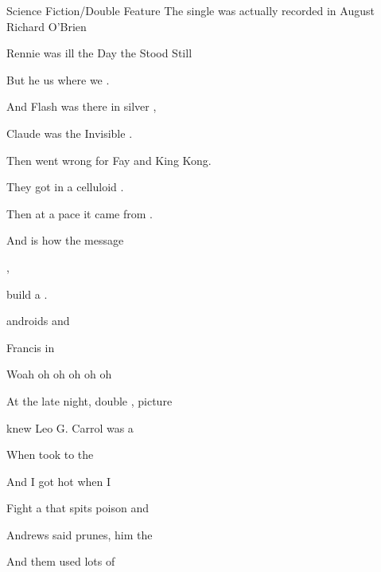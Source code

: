\begin{SBSong}{Science Fiction/Double Feature}
  {The single was actually recorded in August}
  {Richard O'Brien}
  \begin{SBVerse}
     Rennie was ill the Day the  Stood Still

    But he  us where we .

    And Flash  was there in silver ,

    Claude  was the Invisible .

    Then  went wrong for Fay  and King Kong.

    They got  in a celluloid .

    Then at a  pace it came from  .

    And  is how the message 
  \end{SBVerse}
  \begin{SBChorus}
     ,  

       build a .

     androids   and 

     Francis  in  

    Woah oh oh oh  oh oh

    At the late night, double , picture 
  \end{SBChorus}
  \begin{SBVerse}
     knew Leo G. Carrol was  a 

    When  took to the 

    And I  got hot when I   

    Fight a  that spits poison and 

     Andrews said prunes,  him the 

    And  them used lots of 


\end{SBVerse}
\end{SBSong}
